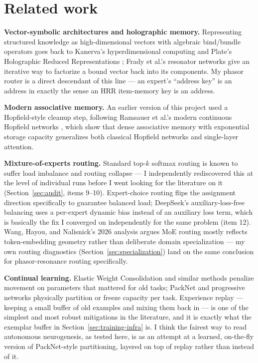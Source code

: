 \documentclass[11pt,letterpaper]{article}
\begin{document}
\section{Related work}

\textbf{Vector-symbolic architectures and holographic memory.} Representing structured knowledge as high-dimensional vectors with algebraic bind/bundle operators goes back to Kanerva's hyperdimensional computing \cite{kanerva} and Plate's Holographic Reduced Representations \cite{plate}; Frady et al.'s resonator networks \cite{frady} give an iterative way to factorize a bound vector back into its components. My phasor router is a direct descendant of this line --- an expert's ``address key'' is an address in exactly the sense an HRR item-memory key is an address.

\textbf{Modern associative memory.} An earlier version of this project used a Hopfield-style cleanup step, following Ramsauer et al.'s modern continuous Hopfield networks \cite{ramsauer}, which show that dense associative memory with exponential storage capacity generalizes both classical Hopfield networks and single-layer attention.

\textbf{Mixture-of-experts routing.} Standard top-$k$ softmax routing \cite{shazeer} is known to suffer load imbalance and routing collapse --- I independently rediscovered this at the level of individual runs before I went looking for the literature on it (Section~\ref{sec:audit}, items 9--10). Expert-choice routing \cite{zhou} flips the assignment direction specifically to guarantee balanced load; DeepSeek's auxiliary-loss-free balancing \cite{deepseek} uses a per-expert dynamic bias instead of an auxiliary loss term, which is basically the fix I converged on independently for the same problem (item 12). Wang, Hayou, and Nalisnick's 2026 analysis \cite{myth} argues MoE routing mostly reflects token-embedding geometry rather than deliberate domain specialization --- my own routing diagnostics (Section~\ref{sec:specialization}) land on the same conclusion for phasor-resonance routing specifically.

\textbf{Continual learning.} Elastic Weight Consolidation \cite{ewc} and similar methods penalize movement on parameters that mattered for old tasks; PackNet \cite{packnet} and progressive networks physically partition or freeze capacity per task. Experience replay --- keeping a small buffer of old examples and mixing them back in --- is one of the simplest and most robust mitigations in the literature, and it is exactly what the exemplar buffer in Section~\ref{sec:training-infra} is. I think the fairest way to read autonomous neurogenesis, as tested here, is as an attempt at a learned, on-the-fly version of PackNet-style partitioning, layered on top of replay rather than instead of it.
\end{document}
